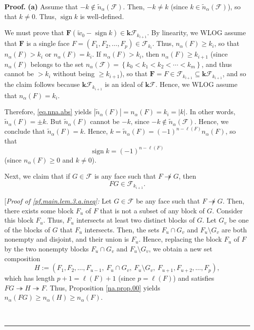 \documentclass[12pt]{article}
\theoremstyle{definition}%
\theoremstyle{definition}%
\theoremstyle{remark}%
\newcommand{\tup}[1]{\left( #1 \right)}
\newcommand{\set}[1]{\left\{ #1 \right\}}
\newcommand{\abs}[1]{\left| #1 \right|} %
\newcommand{\kk}{\mathbf{k}}
\newcommand{\kf}{\kk\mathcal{F}}
\newcommand{\FF}{\mathbf{F}}
\newcommand{\CF}{\mathcal{F}}
\newcommand{\wotil}{\widetilde{w}_0}
\newcommand{\na}{n_{ \alpha } }%
\newcommand{\nna}{\widetilde{n}_{ \alpha } }%
\newcommand{\sign}{\operatorname{sign}}
\newcommand{\con}{\twoheadrightarrow} %
\newenvironment{proof}[1][Proof]{\noindent\textbf{#1.} }{\ \rule{0.5em}{0.5em}}
\begin{document}
\begin{proof}
\textbf{(a)} Assume that $-k \notin \nna\tup{\CF}$.
Then, $-k \neq k$ (since $k \in \nna\tup{\CF}$), so that
$k \neq 0$. Thus, $\sign k$ is well-defined.

We must prove that
$\FF \tup{ \wotil - \sign k }
\in\kf_{k_{i+1}}$.
By linearity, we WLOG assume that $\FF$ is a single face
$F = \tup{F_1, F_2, \ldots, F_p} \in \CF_{k_i}$.
Thus, $\na\tup{F} \geq k_i$, so that
$\na\tup{F} > k_i$ or $\na\tup{F} = k_i$.
If
$\na\tup{F} > k_i$, then $\na\tup{F} \geq k_{i+1}$
(since $ \na\tup{ F } $ belongs to the set $ \na\tup{ \CF } = \set{k_0 < k_1 < k_2 < \cdots  < k_m} $, and thus cannot be $> k_i$ without being $\geq k_{i+1}$),
so that
$\FF = F \in \CF_{k_{i+1}} \subseteq \kf_{k_{i+1}}$,
and so the claim follows because $\kf_{k_{i+1}}$
is an ideal of $\kf$. Hence, we WLOG assume that
$\na\tup{F} = k_i$.

Therefore, \eqref{eq.nna.abs} yields
$\abs{\nna\tup{F}} = \na\tup{F} = k_i = \abs{k}$.
In other words, $\nna\tup{F} = \pm k$. But
$\nna \tup{F}$ cannot be $-k$, since $-k \notin
\nna\tup{\CF}$. Hence, we conclude that
$\nna\tup{F} = k$.
Hence,
$k = \nna\tup{F} = \tup{-1}^{n-\ell \tup{F} }\na\tup{F}$,
so that
\begin{equation}
\sign k
= \tup{-1}^{n-\ell\tup{F} }
\label{pf.main.lem.3.a.sign}
\end{equation}
(since $\na\tup{F} \geq 0$ and $k \neq 0$).

Next, we claim that if $G\in\CF$ is any face such that
$F\not \con G$, then
\begin{equation}
FG\in\CF_{k_{i+1}}.
\label{pf.main.lem.3.a.ineq}
\end{equation}


[\textit{Proof of \eqref{pf.main.lem.3.a.ineq}:} Let $G\in \CF$ be any
face such that $F\not \con G$. Then, there exists some block
$F_{u}$ of $F$ that is not a subset of any block of $G$. Consider this block
$F_{u}$. Thus, $F_{u}$ intersects at least two distinct blocks of $G$. Let
$G_{v}$ be one of the blocks of $G$ that $F_{u}$ intersects. Then,
the sets $F_u \cap G_v$ and $F_u \setminus G_v$ are both nonempty
and disjoint, and their union is $F_u$.
Hence, replacing
the block $F_{u}$ of $F$ by the two nonempty blocks $F_{u}\cap G_{v}$ and
$F_{u}\setminus G_{v}$, we obtain a new set composition
\[
H := \tup{ F_{1},F_{2},\ldots,F_{u-1},\ F_{u}\cap G_{v},\ F_{u}\setminus
G_{v},\ F_{u+1},F_{u+2},\ldots,F_{p} } ,
\]
which has length $p+1 = \ell\tup{F} +1$
(since $p = \ell\tup{F}$) and satisfies
$FG\con H\con F$. Thus, Proposition \ref{na.prop.00} yields
$\na\tup{FG} \geq \na\tup{H} \geq \na\tup{F}$.


\end{proof}
\end{document}
